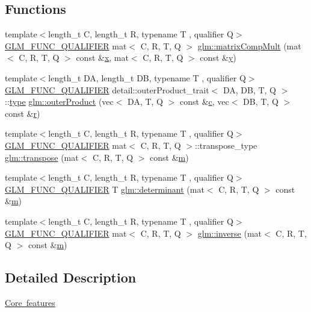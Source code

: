 \subsection*{Functions}
\begin{DoxyCompactItemize}
\item 
{\footnotesize template$<$length\+\_\+t C, length\+\_\+t R, typename T , qualifier Q$>$ }\\\mbox{\hyperlink{setup_8hpp_a33fdea6f91c5f834105f7415e2a64407}{G\+L\+M\+\_\+\+F\+U\+N\+C\+\_\+\+Q\+U\+A\+L\+I\+F\+I\+ER}} mat$<$ C, R, T, Q $>$ \mbox{\hyperlink{group__core__func__matrix_gaf14569404c779fedca98d0b9b8e58c1f}{glm\+::matrix\+Comp\+Mult}} (mat$<$ C, R, T, Q $>$ const \&\mbox{\hyperlink{_s_d_l__opengl_8h_ad0e63d0edcdbd3d79554076bf309fd47}{x}}, mat$<$ C, R, T, Q $>$ const \&\mbox{\hyperlink{_s_d_l__opengl_8h_a1675d9d7bb68e1657ff028643b4037e3}{y}})
\item 
{\footnotesize template$<$length\+\_\+t DA, length\+\_\+t DB, typename T , qualifier Q$>$ }\\\mbox{\hyperlink{setup_8hpp_a33fdea6f91c5f834105f7415e2a64407}{G\+L\+M\+\_\+\+F\+U\+N\+C\+\_\+\+Q\+U\+A\+L\+I\+F\+I\+ER}} detail\+::outer\+Product\+\_\+trait$<$ DA, DB, T, Q $>$\+::\mbox{\hyperlink{_s_d_l__opengl_8h_ad5ddf6fca7b585646515660e810e0188}{type}} \mbox{\hyperlink{namespaceglm_a0f636d2e7ae0bfb8afe265b73f91f52c}{glm\+::outer\+Product}} (vec$<$ DA, T, Q $>$ const \&\mbox{\hyperlink{_s_d_l__opengl__glext_8h_a1f2d7f8147412c43ba2303a56f97ee73}{c}}, vec$<$ DB, T, Q $>$ const \&\mbox{\hyperlink{_s_d_l__opengl_8h_a42ce7cdc612e53abee15043f80220d97}{r}})
\item 
{\footnotesize template$<$length\+\_\+t C, length\+\_\+t R, typename T , qualifier Q$>$ }\\\mbox{\hyperlink{setup_8hpp_a33fdea6f91c5f834105f7415e2a64407}{G\+L\+M\+\_\+\+F\+U\+N\+C\+\_\+\+Q\+U\+A\+L\+I\+F\+I\+ER}} mat$<$ C, R, T, Q $>$\+::transpose\+\_\+type \mbox{\hyperlink{group__core__func__matrix_gae679d841da8ce9dbcc6c2d454f15bc35}{glm\+::transpose}} (mat$<$ C, R, T, Q $>$ const \&\mbox{\hyperlink{_s_d_l__opengl__glext_8h_af593500c283bf1a787a6f947f503a5c2}{m}})
\item 
{\footnotesize template$<$length\+\_\+t C, length\+\_\+t R, typename T , qualifier Q$>$ }\\\mbox{\hyperlink{setup_8hpp_a33fdea6f91c5f834105f7415e2a64407}{G\+L\+M\+\_\+\+F\+U\+N\+C\+\_\+\+Q\+U\+A\+L\+I\+F\+I\+ER}} T \mbox{\hyperlink{group__core__func__matrix_gad7928795124768e058f99dce270f5c8d}{glm\+::determinant}} (mat$<$ C, R, T, Q $>$ const \&\mbox{\hyperlink{_s_d_l__opengl__glext_8h_af593500c283bf1a787a6f947f503a5c2}{m}})
\item 
{\footnotesize template$<$length\+\_\+t C, length\+\_\+t R, typename T , qualifier Q$>$ }\\\mbox{\hyperlink{setup_8hpp_a33fdea6f91c5f834105f7415e2a64407}{G\+L\+M\+\_\+\+F\+U\+N\+C\+\_\+\+Q\+U\+A\+L\+I\+F\+I\+ER}} mat$<$ C, R, T, Q $>$ \mbox{\hyperlink{group__core__func__matrix_gace61e11fc177491beeca0c6971e2f3fc}{glm\+::inverse}} (mat$<$ C, R, T, Q $>$ const \&\mbox{\hyperlink{_s_d_l__opengl__glext_8h_af593500c283bf1a787a6f947f503a5c2}{m}})
\end{DoxyCompactItemize}


\subsection{Detailed Description}
\mbox{\hyperlink{group__core}{Core features}} 